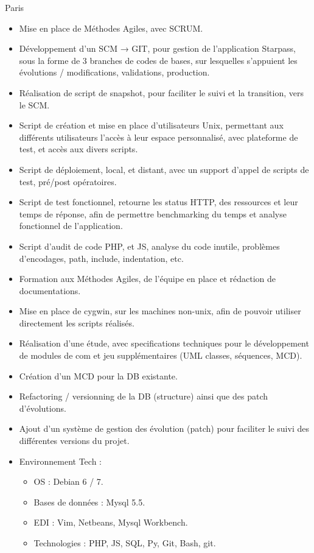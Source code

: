 \documentclass[10pt,a4paper,sans]{moderncv}
\begin{document}
{Paris}{
  \begin{itemize}%
    \item Mise en place de Méthodes Agiles, avec SCRUM.
    \item Développement d'un SCM → GIT, pour gestion de l'application Starpass, sous la forme de 3 branches de codes de bases, sur lesquelles s'appuient les évolutions / modifications, validations, production.
    \item Réalisation de script de snapshot, pour faciliter le suivi et la transition, vers le SCM.
    \item Script de création et mise en place d'utilisateurs Unix, permettant aux différents utilisateurs l'accès à leur espace personnalisé, avec plateforme de test, et accès aux divers scripts.
    \item Script de déploiement, local, et distant, avec un support d'appel de scripts de test, pré/post opératoires.
    \item Script de test fonctionnel, retourne les status HTTP, des ressources et leur temps de réponse, afin de permettre benchmarking du temps et analyse fonctionnel de l'application.
    \item Script d'audit de code PHP, et JS, analyse du code inutile, problèmes d'encodages, path, include, indentation, etc.
    \item Formation aux Méthodes Agiles, de l'équipe en place et rédaction de documentations.
    \item Mise en place de cygwin, sur les machines non-unix, afin de pouvoir utiliser directement les scripts réalisés.
    \item Réalisation d'une étude, avec specifications techniques pour le développement de modules de com et jeu supplémentaires (UML classes, séquences, MCD).
    \item Création d'un MCD pour la DB existante.
    \item Refactoring / versionning de la DB (structure) ainsi que des patch d'évolutions.
    \item Ajout d'un système de gestion des évolution (patch) pour faciliter le suivi des différentes versions du projet.
    \item Environnement Tech :
      \begin{itemize}%
        \item OS : Debian 6 / 7.
        \item Bases de données : Mysql 5.5.
        \item EDI : Vim, Netbeans, Mysql Workbench.
        \item Technologies : PHP, JS, SQL, Py, Git, Bash, git.
      \end{itemize}
  \end{itemize}}
\end{document}

